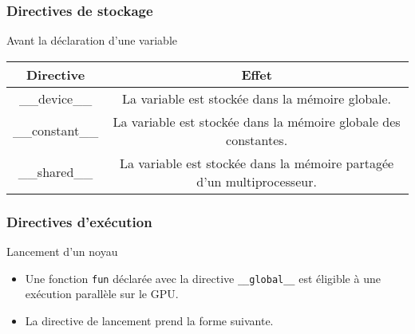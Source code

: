 \begin{frame}
    \frametitle{Directives de stockage}
\begin{block}{Avant la déclaration d'une variable}
    \renewcommand{\arraystretch}{2.5}
    \vskip 20pt
    \begin{tabular}{|c|c|}
        \hline
        \rowcolor{lightgray} Directive & Effet \\ \hline
        \_\_device\_\_ & \begin{minipage}{0.8\textwidth}
            La variable est stockée dans la mémoire globale. 
        \end{minipage} \\ \hline
        \_\_constant\_\_ & \begin{minipage}{0.8\textwidth}
            La variable est stockée dans la mémoire globale des constantes.
        \end{minipage} \\ \hline
        \_\_shared\_\_ & \begin{minipage}{0.8\textwidth}
            La variable est stockée dans la mémoire partagée d'un multiprocesseur.
        \end{minipage} \\ \hline
    \end{tabular}
\end{block}
\end{frame}

\begin{frame}
    \frametitle{Directives d'exécution}
\begin{block}{Lancement d'un noyau}
    \begin{itemize}
          \item<+-> Une fonction \texttt{fun} déclarée avec la directive \texttt{\_\_global\_\_} est éligible à une exécution parallèle 
  sur le GPU.
  \item<+-> La directive de lancement prend la forme suivante.
    \end{itemize}

\end{block}

\end{frame}
